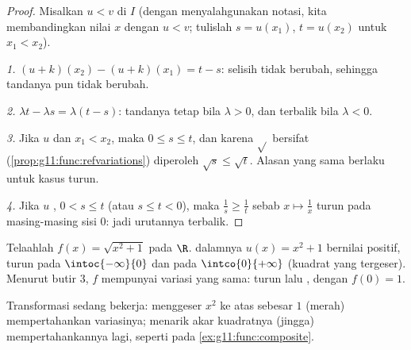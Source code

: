\begin{proof}
Misalkan $u < v$ di $I$ (dengan menyalahgunakan notasi, kita membandingkan
nilai $x$ dengan $u < v$; tulislah $s = u(x_1)$, $t = u(x_2)$ untuk 
$x_1 < x_2$).

\emph{1.} $(u+k)(x_2) - (u+k)(x_1) = t - s$: selisih  tidak
berubah, sehingga tandanya pun tidak berubah.

\emph{2.} $\lambda t - \lambda s = \lambda(t - s)$: tandanya tetap bila
$\lambda > 0$, dan terbalik bila $\lambda < 0$.

\emph{3.} Jika $u$  dan $x_1 < x_2$, maka $0 \leq s \leq t$, dan
karena $\sqrt{}$ bersifat  (\cref{prop:g11:func:refvariations}) diperoleh
$\sqrt s \leq \sqrt t$. Alasan yang sama berlaku untuk kasus turun.

\emph{4.} Jika $u$ , $0 < s \leq t$ (atau $s \leq t < 0$), maka
$\frac1s \geq \frac1t$ sebab $x \mapsto \frac1x$ turun pada masing-masing
sisi $0$: jadi urutannya terbalik.
\end{proof}

\begin{example}\label{ex:g11:func:composite}
Telaahlah $f(x) = \sqrt{x^2 + 1}$ pada $\R$.  dalamnya
$u(x) = x^2 + 1$ bernilai positif, turun pada $\intoc{-\infty}{0}$ dan
 pada $\intco{0}{+\infty}$ (kuadrat yang tergeser). Menurut butir 3, $f$
mempunyai variasi yang sama: turun lalu , dengan 
$f(0) = 1$.
\end{example}

\begin{omfigure}

{\small Transformasi sedang bekerja: menggeser $x^2$ ke atas sebesar $1$
(merah) mempertahankan variasinya; menarik akar kuadratnya (jingga)
mempertahankannya lagi, seperti pada \cref{ex:g11:func:composite}.}
\end{omfigure}

